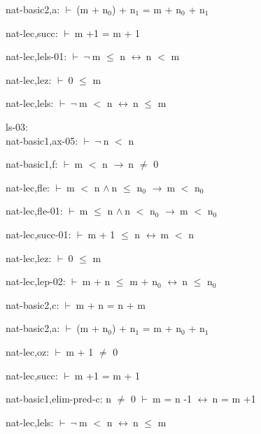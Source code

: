 \documentclass[a4paper]{article}
\newcommand{\Fol}{\mbox{$\vdash\ $}}
\newcommand{\Not}{\mbox{$\neg\ $}}
\newcommand{\And}{\mbox{$\wedge\ $}}
\newcommand{\Imp}{\mbox{$\rightarrow\ $}}
\newcommand{\Equiv}{\mbox{$\leftrightarrow\ $}}
\begin{document}
nat-basic2,a: 
 \Fol (m + $\mbox{n}_{0}$) + $\mbox{n}_{1}$ = m + $\mbox{n}_{0}$ + $\mbox{n}_{1}$



nat-lec,succ: 
 \Fol m +1 = m + 1



nat-lec,lels-01: 
 \Fol \Not m $\le$ n \Equiv n $<$ m



nat-lec,lez: 
 \Fol 0 $\le$ m



nat-lec,lels: 
 \Fol \Not m $<$ n \Equiv n $\le$ m



\bigskip

ls-03:\\ nat-basic1,ax-05: 
 \Fol \Not n $<$ n



nat-basic1,f: 
 \Fol m $<$ n \Imp n $\neq$ 0



nat-lec,fle: 
 \Fol m $<$ n \And n $\le$ $\mbox{n}_{0}$ \Imp m $<$ $\mbox{n}_{0}$



nat-lec,fle-01: 
 \Fol m $\le$ n \And n $<$ $\mbox{n}_{0}$ \Imp m $<$ $\mbox{n}_{0}$



nat-lec,succ-01: 
 \Fol m + 1 $\le$ n \Equiv m $<$ n



nat-lec,lez: 
 \Fol 0 $\le$ m



nat-lec,lep-02: 
 \Fol m + n $\le$ m + $\mbox{n}_{0}$ \Equiv n $\le$ $\mbox{n}_{0}$



nat-basic2,c: 
 \Fol m + n = n + m



nat-basic2,a: 
 \Fol (m + $\mbox{n}_{0}$) + $\mbox{n}_{1}$ = m + $\mbox{n}_{0}$ + $\mbox{n}_{1}$



nat-lec,oz: 
 \Fol m + 1 $\neq$ 0



nat-lec,succ: 
 \Fol m +1 = m + 1



nat-basic1,elim-pred-c: 
n $\neq$ 0
 \Fol m = n -1 \Equiv n = m +1



nat-lec,lels: 
 \Fol \Not m $<$ n \Equiv n $\le$ m



\bigskip
\end{document}
